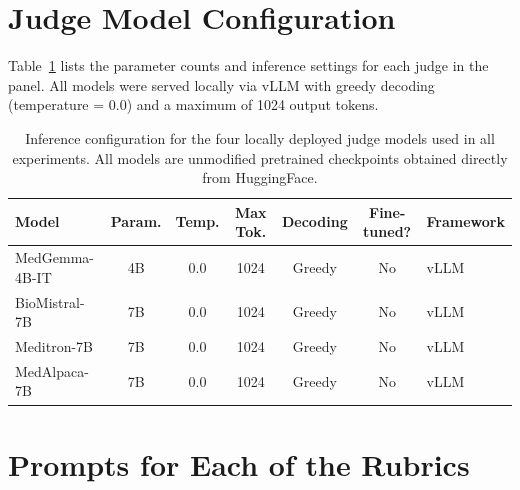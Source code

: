 \documentclass[11pt]{article}
\begin{document}

\section{Judge Model Configuration}
\label{app:model_config}

Table~\ref{tab:model_config} lists the parameter counts and inference 
settings for each judge in the panel. All models were served locally 
via vLLM with greedy decoding (temperature = 0.0) and a maximum of 
1024 output tokens.

\begin{table}[h!]
\centering
\renewcommand{\arraystretch}{1.2}
\begin{tabular}{l c c c c c l}
\toprule
\textbf{Model} & \textbf{Param.} & \textbf{Temp.} & \textbf{Max Tok.} & \textbf{Decoding} & \textbf{Fine-tuned?} & \textbf{Framework} \\
\midrule
MedGemma-4B-IT  & 4B & 0.0 & 1024 & Greedy & No & vLLM \\
BioMistral-7B   & 7B & 0.0 & 1024 & Greedy & No & vLLM \\
Meditron-7B     & 7B & 0.0 & 1024 & Greedy & No & vLLM \\
MedAlpaca-7B    & 7B & 0.0 & 1024 & Greedy & No & vLLM \\
\bottomrule
\end{tabular}%
\caption{Inference configuration for the four locally deployed judge 
models used in all experiments. All models are unmodified pretrained 
checkpoints obtained directly from HuggingFace.}
\label{tab:model_config}
\end{table}

\section{Prompts for Each of the Rubrics}
\label{app:prompts}
\end{document}
